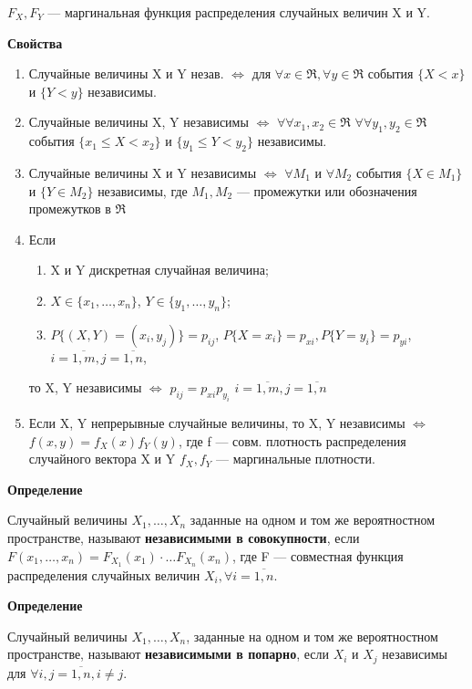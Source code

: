$F_X, F_Y$ --- маргинальная функция распределения случайных величин X и Y.

\textbf{Свойства}

\begin{enumerate}[label=\arabic*.]
	\item Случайные величины X и Y незав. $\Leftrightarrow$ для $\forall x \in \Re, \forall y \in \Re$ события $\{X<x\}$ и $\{Y < y\}$ независимы.
	\item Случайные величины X, Y независимы $\Leftrightarrow$ $\forall \forall x_1, x_2 \in \Re$ $\forall \forall y_1, y_2 \in \Re$ события $\{x_1 \leq X < x_2\}$ и $\{y_1 \leq Y < y_2\}$ независимы.
	\item Случайные величины X и Y независимы $\Leftrightarrow$ $\forall M_1$ и $\forall M_2$ события $\{X \in M_1\}$ и $\{Y \in M_2\}$ независимы, где $M_1, M_2$ --- промежутки или обозначения промежутков в $\Re$
	\item Если \begin{enumerate}[label=\arabic*]
		\item X и Y дискретная случайная величина;
		\item $X \in \{x_1, \dots, x_n\}$, $Y \in \{y_1, \dots, y_n\}$;
		\item $P\{(X, Y)=(x_i, y_j)\} = p_{ij}$, $P\{X=x_i\}=p_{xi}, P\{Y=y_i\}=p_{yi}$, $i=\overline{1,m}, j=\overline{1,n}$,
	\end{enumerate}
	то X, Y независимы $\Leftrightarrow$ $p_{ij} = p_{xi}p_{y_i}$ $i=\overline{1,m}, j=\overline{1,n}$
	\item Если X, Y непрерывные случайные величины, то X, Y независимы $\Leftrightarrow$ $f(x, y) = f_X(x)f_Y(y)$, где f --- совм. плотность распределения случайного вектора X и Y $f_X, f_Y$ --- маргинальные плотности.
\end{enumerate}

\textbf{Определение}

Случайный величины $X_1, \dots, X_n$ заданные на одном и том же вероятностном пространстве, называют \textbf{независимыми в совокупности}, если $F(x_1, \dots, x_n) = F_{X_1}(x_1) \cdot \dots F_{X_n}(x_n)$, где F --- совместная функция распределения случайных величин $X_i, \forall i = \overline{1,n}$.

\textbf{Определение}

Случайный величины $X_1, \dots, X_n$, заданные на одном и том же вероятностном пространстве, называют \textbf{независимыми в попарно}, если $X_i$ и $X_j$ независимы  для $\forall i,j = \overline{1,n}, i \neq j$.

